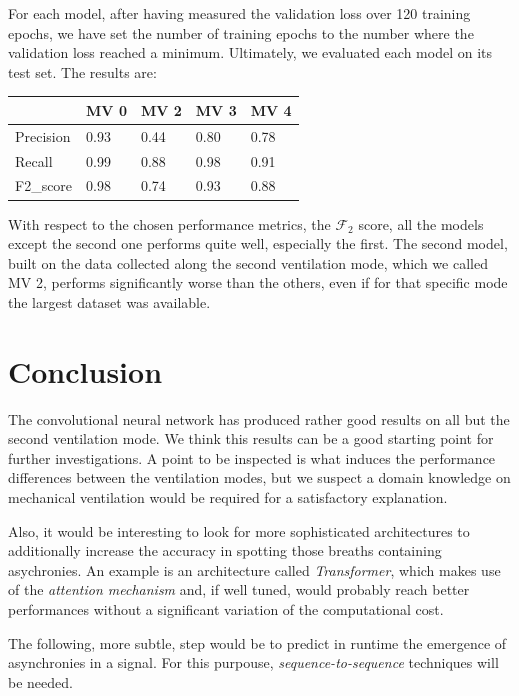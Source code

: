 \documentclass[a4paper, twoside]{article}
\begin{document}
For each model, after having measured the validation loss over 120 training epochs, we have set the number of training epochs to the number where the validation loss reached a minimum. Ultimately, we evaluated each model on its test set. The results are:

\begin{table}[H]
\begin{tabular}{l|l|l|l|l|}
\cline{2-5}
                                & MV 0 & MV 2 & MV 3 & MV 4 \\ \hline
\multicolumn{1}{|l|}{Precision} & 0.93 & 0.44 & 0.80 & 0.78 \\ \hline
\multicolumn{1}{|l|}{Recall}    & 0.99 & 0.88 & 0.98 & 0.91 \\ \hline
\multicolumn{1}{|l|}{F2\_score} & 0.98 & 0.74 & 0.93 & 0.88 \\ \hline
\end{tabular}
\end{table}

With respect to the chosen performance metrics, the $\mathcal{F}_2$ score, all the models except the second one performs quite well, especially the first. The second model, built on the data collected along the second ventilation mode, which we called MV 2, performs significantly worse than the others, even if for that specific mode the largest dataset was available.


\newpage

\section{Conclusion}

The convolutional neural network has produced rather good results on all but the second ventilation mode. We think this results can be a good starting point for further investigations. A point to be inspected is what induces the performance differences between the ventilation modes, but we suspect a domain knowledge on mechanical ventilation would be required for a satisfactory explanation.

Also, it would be interesting to look for more sophisticated architectures to additionally increase the accuracy in spotting those breaths containing asychronies. An example is an architecture called \textit{Transformer}, which makes use of the \textit{attention mechanism} and, if well tuned, would probably reach better performances without a significant variation of the computational cost.

The following, more subtle, step would be to predict in runtime the emergence of asynchronies in a signal. For this purpouse, \textit{sequence-to-sequence} techniques will be needed.
\end{document}
